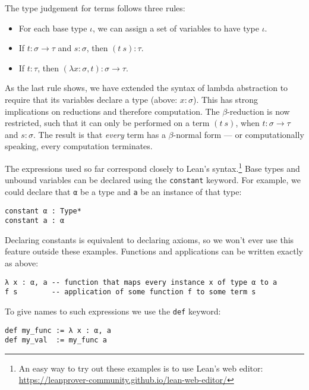 \vspace{3mm}

\noindent The type judgement for terms follows three rules:

\begin{itemize}
  \item For each base type $\iota$, we can assign a set of variables to have type $\iota$.
  \item If $t : \sigma \to \tau$ and $s : \sigma$, then $(t\ s) : \tau$.
  \item If $t : \tau$, then $(\lambda x : \sigma, t) : \sigma \to \tau$.
\end{itemize}

\noindent As the last rule shows, we have extended the syntax of lambda abstraction to require that its variables declare a type (above: $x : \sigma$).
This has strong implications on reductions and therefore computation.
The $\beta$-reduction is now restricted, such that it can only be performed on a term $(t\ s)$, when $t : \sigma \to \tau$ and $s : \sigma$.
The result is that \emph{every} term has a $\beta$-normal form --- or computationally speaking, every computation terminates.

\vspace{3mm}

\noindent The expressions used so far correspond closely to Lean's syntax.\footnote{
  An easy way to try out these examples is to use Lean's web editor: \url{https://leanprover-community.github.io/lean-web-editor/}
}
Base types and unbound variables can be declared using the \verb|constant| keyword. 
For example, we could declare that \lstinline{α} be a type and \lstinline{a} be an instance of that type:

\begin{lstlisting}
constant α : Type*
constant a : α 
\end{lstlisting}

\noindent Declaring constants is equivalent to declaring axioms, so we won't ever use this feature outside these examples.
Functions and applications can be written exactly as above:

\begin{lstlisting}
λ x : α, a -- function that maps every instance x of type α to a
f s        -- application of some function f to some term s
\end{lstlisting}

\noindent To give names to such expressions we use the \verb|def| keyword:

\begin{lstlisting}
def my_func := λ x : α, a
def my_val  := my_func a
\end{lstlisting}

